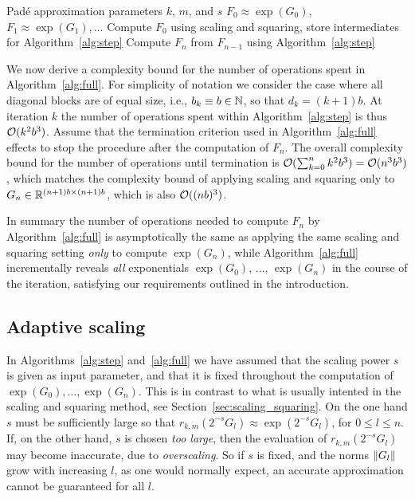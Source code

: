 \begin{algorithm}[ht]
    \caption{Approximation of $\exp(G_0), \exp(G_1), \dotsc$
    \label{alg:full}}
    \begin{algorithmic}[1]
        \REQUIRE Pad\'e approximation parameters $k$, $m$, and $s$
        \ENSURE $F_0 \approx \exp(G_0)$, $F_1 \approx \exp(G_1), \dotsc$
        \STATE Compute $F_0$ using scaling and squaring, store
            intermediates for Algorithm~\ref{alg:step}
            \STATE Compute $F_{n}$ from $F_{n-1}$ using Algorithm~\ref{alg:step}
             \RETURN
            \ENDIF
        \ENDFOR
    \end{algorithmic}
\end{algorithm}

We now derive a complexity bound for the number of operations
spent in Algorithm~\ref{alg:full}.  For simplicity of notation we
consider the case where all diagonal blocks are of equal size, i.e.,
$b_k \equiv b \in {\mathbb N}$, so that $d_k = (k+1)b$.  At iteration $k$ the
number of operations spent within Algorithm~\ref{alg:step} is thus 
${\mathcal O}(k^2 b^3)$.  Assume that the termination criterion used in
Algorithm~\ref{alg:full} effects to stop the procedure after the
computation of $F_n$.  The overall complexity bound for the number of
operations until termination is ${\mathcal O}(\sum_{k=0}^n k^2 b^3 ) =
{\mathcal O}(n^3 b^3)$, which matches the complexity bound of applying
scaling and squaring only to $G_n \in {\mathbb R}^{(n+1)b \times (n+1)b}$,
which is also ${\mathcal O}( (nb)^3 )$.

In summary the number of operations needed to compute $F_n$ by
Algorithm~\ref{alg:full} is asymptotically the same as applying the
same scaling and squaring setting \emph{only} to compute $\exp(G_n)$,
while Algorithm~\ref{alg:full} incrementally reveals \emph{all}
exponentials $\exp(G_0)$, $\dotsc$, $\exp(G_n)$ in the course of the
iteration, satisfying our requirements outlined in the introduction.

\subsection{Adaptive scaling}

In Algorithms~\ref{alg:step} and~\ref{alg:full} we have assumed
that the scaling power $s$ is given as input parameter, and that it is
fixed throughout the computation of $\exp(G_0), \dotsc, \exp(G_n)$.
This is in contrast to what is usually intented in the scaling and squaring method, see Section~\ref{sec:scaling_squaring}.  On the one hand $s$
must be sufficiently large so that $r_{k,m}(2^{-s} G_l) \approx \exp(2^{-s}
G_l)$, for $0 \le l \le n$.  If, on the other hand, $s$ is chosen
\emph{too large}, then the evaluation of $r_{k,m}(2^{-s}G_l)$ may become
inaccurate, due to \emph{overscaling}.
So if $s$ is fixed, and the norms $\lVert G_l \rVert$ grow with
increasing $l$, as one would normally expect, an accurate approximation cannot
be guaranteed for all $l$.

